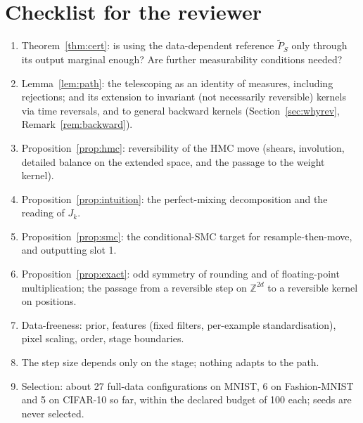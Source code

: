 \documentclass[11pt]{article}
\theoremstyle{definition}
\theoremstyle{remark}
\newcommand{\Pt}{\widetilde{P}}
\newcommand{\Z}{\mathbb{Z}}
\begin{document}
\section{Checklist for the reviewer}\label{sec:checklist}
\begin{enumerate}[nosep]
\item Theorem~\ref{thm:cert}: is using the data-dependent reference $\Pt_S$ only through its output marginal enough? Are
  further measurability conditions needed?
\item Lemma~\ref{lem:path}: the telescoping as an identity of measures, including rejections; and its extension to
  invariant (not necessarily reversible) kernels via time reversals, and to general backward kernels
  (Section~\ref{sec:whyrev}, Remark~\ref{rem:backward}).
\item Proposition~\ref{prop:hmc}: reversibility of the HMC move (shears, involution, detailed balance on the extended space,
  and the passage to the weight kernel).
\item Proposition~\ref{prop:intuition}: the perfect-mixing decomposition and the reading of $J_k$.
\item Proposition~\ref{prop:smc}: the conditional-SMC target for resample-then-move, and outputting slot 1.
\item Proposition~\ref{prop:exact}: odd symmetry of rounding and of floating-point multiplication; the passage from a
  reversible step on $\Z^{2d}$ to a reversible kernel on positions.
\item Data-freeness: prior, features (fixed filters, per-example standardisation), pixel scaling, order, stage boundaries.
\item The step size depends only on the stage; nothing adapts to the path.
\item Selection: about 27 full-data configurations on MNIST, 6 on Fashion-MNIST and 5 on CIFAR-10 so far, within the
  declared budget of 100 each; seeds are never selected.
\end{enumerate}
\end{document}
